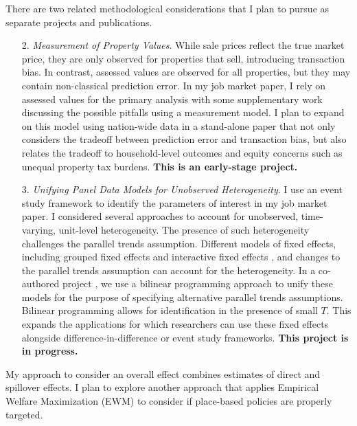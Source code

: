 There are two related methodological considerations that I plan to pursue as separate projects and publications.

\begin{enumerate}
\item[2.] \textit{Measurement of Property Values}. While sale prices reflect the true market price, they are only observed for properties that sell, introducing transaction bias. In contrast, assessed values are observed for all properties, but they may contain non-classical prediction error. In my job market paper, I rely on assessed values for the primary analysis with some supplementary work discussing the possible pitfalls using a measurement model. I plan to expand on this model using nation-wide data in a stand-alone paper that not only considers the tradeoff between prediction error and transaction bias, but also relates the tradeoff to household-level outcomes and equity concerns such as unequal property tax burdens. \textbf{This is an early-stage project.}

\item[3.] \textit{Unifying Panel Data Models for Unobserved Heterogeneity}. I use an event study framework to identify the parameters of interest in my job market paper. I considered several approaches to account for unobserved, time-varying, unit-level heterogeneity. The presence of such heterogeneity challenges the parallel trends assumption. Different models of fixed effects, including grouped fixed effects and interactive fixed effects \citep{bai_panel_2009,bonhomme_grouped_2015}, and changes to the parallel trends assumption can account for the heterogeneity. In a co-authored project \citep{shea_unifying_2023}, we use a bilinear programming approach to unify these models for the purpose of specifying alternative parallel trends assumptions. Bilinear programming allows for identification in the presence of small $T$. This expands the applications for which researchers can use these fixed effects alongside difference-in-difference or event study frameworks. \textbf{This project is in progress.}
\end{enumerate} 

My approach to consider an overall effect combines estimates of direct and spillover effects. I plan to explore another approach that applies Empirical Welfare Maximization (EWM) to consider if place-based policies are properly targeted.

